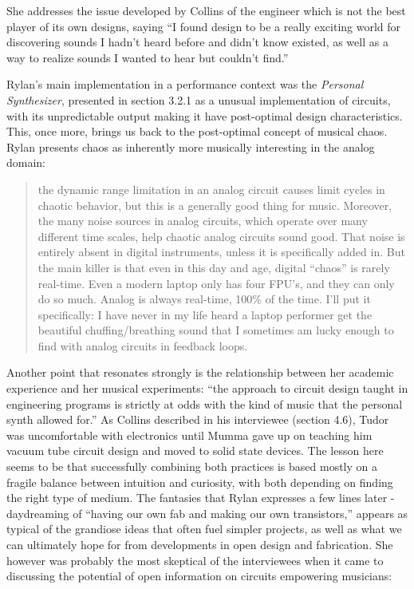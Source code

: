 She addresses the issue developed by Collins of the engineer which is not the best player of its own designs, saying ``I found design to be a really exciting world for discovering sounds I hadn't heard before and didn't know existed, as well as a way to realize sounds I wanted to hear but couldn't find.''

Rylan's main implementation in a performance context was the \textit{Personal Synthesizer}, presented in section 3.2.1 as a unusual implementation of circuits, with its unpredictable output making it have post-optimal design characteristics. This, once more, brings us back to the post-optimal concept of musical chaos. Rylan presents chaos as inherently more musically interesting in the analog domain: 

\begin{quote}
	the dynamic range limitation in an analog circuit causes limit cycles in chaotic behavior, but this is a generally good thing for music. Moreover, the many noise sources in analog circuits, which operate over many different time scales, help chaotic analog circuits sound good. That noise is entirely absent in digital instruments, unless it is specifically added in. But the main killer is that even in this day and age, digital “chaos” is rarely real-time. Even a modern laptop only has four FPU’s, and they can only do so much. Analog is always real-time, 100\% of the time. I’ll put it specifically: I have never in my life heard a laptop performer get the beautiful chuffing/breathing sound that I sometimes am lucky enough to find with analog circuits in feedback loops.
\end{quote}

Another point that resonates strongly is the relationship between her academic experience and her musical experiments: ``the approach to circuit design taught in engineering programs is strictly at odds with the kind of music that the personal synth allowed for.'' As Collins described in his interviewee (section 4.6), Tudor was uncomfortable with electronics until Mumma gave up on teaching him vacuum tube circuit design and moved to solid state devices. The lesson here seems to be that successfully combining both practices is based mostly on a fragile balance between intuition and curiosity, with both depending on finding the right type of medium. The fantasies that Rylan expresses a few lines later - daydreaming of ``having our own fab and making our own transistors,'' appears as typical of the grandiose ideas that often fuel simpler projects, as well as what we can ultimately hope for from developments in open design and fabrication. She however was probably the most skeptical of the interviewees when it came to discussing the potential of open information on circuits empowering musicians: 

